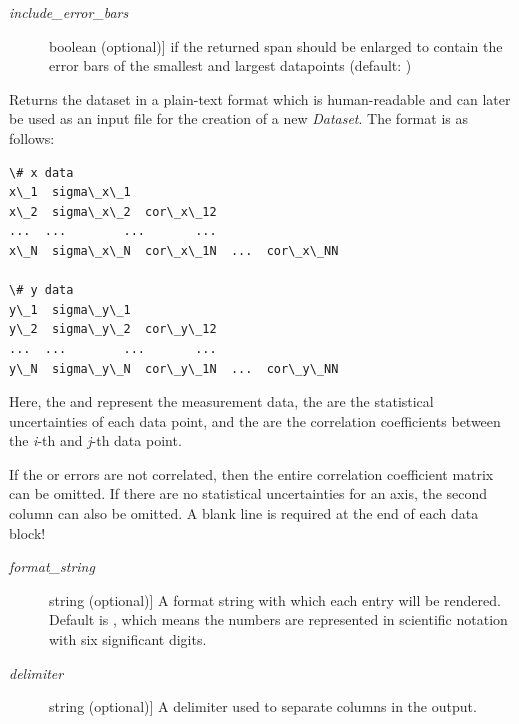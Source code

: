 \documentclass[a4paper,10pt,english]{sphinxmanual}
\begin{document}
\begin{fulllineitems}
\begin{fulllineitems}
\begin{description}
\item[{\emph{include\_error\_bars}}] \leavevmode{[}boolean (optional){]}
 if the returned span should be enlarged to
contain the error bars of the smallest and largest datapoints
(default: )

\end{description}

\end{fulllineitems}


\begin{fulllineitems}
\label{index:kafe.dataset.Dataset.get_formatted}
Returns the dataset in a plain-text format which is human-readable and
can later be used as an input file for the creation of a new \emph{Dataset}.
\label{index:get-formatted}
The format is as follows:

\begin{Verbatim}[commandchars=\\\{\}]
\# x data
x\_1  sigma\_x\_1
x\_2  sigma\_x\_2  cor\_x\_12
...  ...        ...       ...
x\_N  sigma\_x\_N  cor\_x\_1N  ...  cor\_x\_NN

\# y data
y\_1  sigma\_y\_1
y\_2  sigma\_y\_2  cor\_y\_12
...  ...        ...       ...
y\_N  sigma\_y\_N  cor\_y\_1N  ...  cor\_y\_NN
\end{Verbatim}

Here, the  and  represent the measurement data, the
 are the statistical uncertainties of each data point, and
the  are the correlation coefficients between the \emph{i}-th
and \emph{j}-th data point.

If the  or  errors are not correlated, then the entire
correlation coefficient matrix can be omitted. If there are no
statistical uncertainties for an axis, the second column can also be
omitted. A blank line is required at the end of each data block!
\begin{description}
\item[{\emph{format\_string}}] \leavevmode{[}string (optional){]}
A format string with which each entry will be rendered. Default is
, which means the numbers are represented in scientific
notation with six significant digits.

\item[{\emph{delimiter}}] \leavevmode{[}string (optional){]}
A delimiter used to separate columns in the output.


\end{description}
\end{fulllineitems}
\end{fulllineitems}
\end{document}
